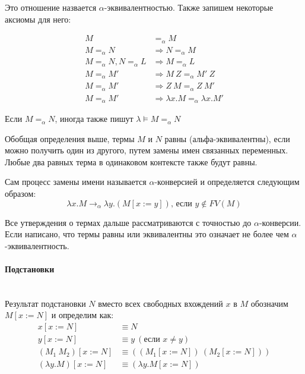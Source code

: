 \documentclass[lambda.tex]{subfiles}
\begin{document}
Это отношение назвается $\alpha$-эквивалентностью. Также запишем некоторые аксиомы для него:

\begin{align*}
	M &=_\alpha M\\
	M =_\alpha N &\Rightarrow N =_\alpha M\\
	M =_\alpha N, N =_\alpha L &\Rightarrow M =_\alpha L\\
	M =_\alpha M' &\Rightarrow M\ Z =_\alpha M'\ Z\\
	M =_\alpha M' &\Rightarrow Z\ M =_\alpha Z\ M'\\
	M =_\alpha M' &\Rightarrow \lambda x.M =_\alpha \lambda x.M'
\end{align*}

Если $M =_\alpha N$, иногда также пишут $\lambda\models M =_\alpha N$


Обобщая определения выше, термы $M$ и $N$ равны (альфа-эквивалентны), если можно получить один из другого, путем замены имен связанных переменных. Любые два равных терма в одинаковом контексте также будут равны.

Сам процесс замены имени называется $\alpha$-конверсией и определяется следующим образом:
\begin{equation*}
	\lambda x.M \rightarrow_\alpha \lambda y.(M[x := y]) \text {, если } y \not\in FV(M)\tag{$\alpha$}
\end{equation*}

\begin{tcolorbox}
	Все утверждения о термах дальше рассматриваются с точностью до $\alpha$-конверсии. Если написано, что термы равны или эквивалентны это означает не более чем $\alpha$-эквивалентность.
\end{tcolorbox}

\newpage
\paragraph{Подстановки} %
\label{par:substitution}~\\

Результат подстановки $N$ вместо всех свободных вхождений $x$ в $M$ обозначим $M[x := N]$ и определим как:
\begin{align*}
	x[x := N] &\equiv N\\
	y[x := N] &\equiv y\ (\text{если } x \neq y)\\
	(M_1 \ M_2 )[x := N] &\equiv ((M_1 [x := N])\ (M_2 [x := N]))\\
	(\lambda y.M)[x := N] &\equiv (\lambda y.M[x := N])
\end{align*}
\end{document}
